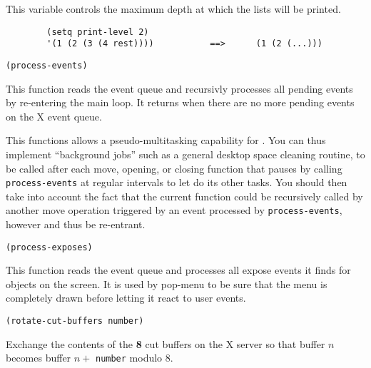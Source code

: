 

This variable controls the maximum depth at which the lists will be printed.

{\exemplefont\begin{verbatim}
        (setq print-level 2)
        '(1 (2 (3 (4 rest))))           ==>      (1 (2 (...)))
\end{verbatim}}



{\usagefont\begin{verbatim}
(process-events)
\end{verbatim}}\usageupspace

This function reads the event queue and recursivly processes all pending
events by re-entering the main {\GWM} loop. It returns when there are no
more pending events on the X event queue.

This functions allows a pseudo-multitasking capability for {\GWM}.
You can thus implement ``background jobs'' such as a general desktop space
cleaning routine, to be called after each move, opening, or closing function
that pauses by calling \verb"process-events" at regular intervals to let
{\GWM} do its other tasks. You should then take into account the fact that
the current function could be recursively called by another move operation
triggered by an event processed by \verb"process-events", however and thus
be re-entrant.

        
{\usagefont\begin{verbatim}
(process-exposes)
\end{verbatim}}\usageupspace

This function reads the event queue and processes all expose events it finds
for {\GWM} objects on the screen. It is used by pop-menu to be sure that the
menu is completely drawn before letting it react to user events.


{\usagefont\begin{verbatim}
(rotate-cut-buffers number)
\end{verbatim}}\usageupspace

Exchange the contents of the {\bf 8} cut buffers on the X server so that
buffer $n$ becomes buffer $n + $ \verb"number" modulo 8.

